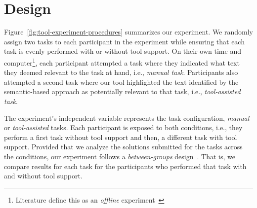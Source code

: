 
\section{Design}
\label{cp6:design}



Figure~\ref{fig:tool-experiment-procedures} summarizes our experiment.
We randomly assign two tasks to each participant in the experiment
while 
ensuring that each task is evenly performed with or without tool support.
On their own time and computer\footnote{Literature define this as an \textit{offline} experiment~\cite{wohlin2012, DeLucia2012} }, 
each participant attempted a task where they indicated 
what text they deemed relevant to the task at hand, i.e., \textit{manual task}.
Participants also attempted a second task 
 where our tool highlighted the text identified by 
the semantic-based approach as potentially relevant to that task, i.e., \textit{tool-assisted task}.



The experiment's independent variable represents the task configuration, \textit{manual} or \textit{tool-assisted} tasks. Each participant is exposed to both conditions, i.e., they perform 
a first task without tool support and then, a different task with tool support.
Provided that we analyze the solutions submitted for the tasks across the conditions, 
our experiment follows a \textit{between-groups} design~\cite{Lazar2017-cp3, wohlin2012}.
That is,  we compare results for each task for the participants who performed that task with and without tool support.


















